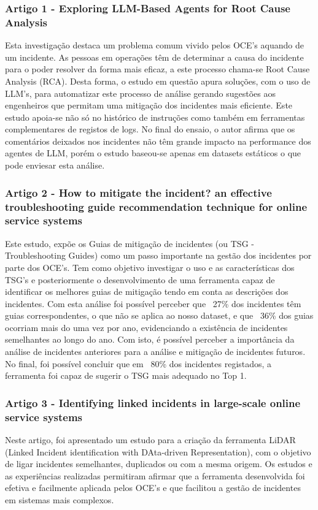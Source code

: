 		\subsubsection{Artigo 1 - Exploring LLM-Based Agents for Root Cause Analysis}
			Esta investigação destaca um problema comum vivido pelos OCE's aquando de um incidente. As pessoas em operações têm de determinar a causa do incidente para o poder resolver da forma mais eficaz, a este processo chama-se Root Cause Analysis (RCA). Desta forma, o estudo em questão apura soluções, com o uso de LLM's, para automatizar este processo de análise gerando sugestões aos engenheiros que permitam uma mitigação dos incidentes mais eficiente. Este estudo apoia-se não só no histórico de instruções como também em ferramentas complementares de registos de logs. No final do ensaio, o autor afirma que os comentários deixados nos incidentes não têm grande impacto na performance dos agentes de LLM, porém o estudo baseou-se apenas em datasets estáticos o que pode enviesar esta análise.
	
		\subsubsection{Artigo 2 - How to mitigate the incident? an effective troubleshooting guide recommendation technique for online service systems}
			Este estudo, expõe os Guias de mitigação de incidentes (ou TSG - Troubleshooting Guides) como um passo importante na gestão dos incidentes por parte dos OCE's. Tem como objetivo investigar o uso e as características dos TSG's e posteriormente o desenvolvimento de uma ferramenta capaz de identificar os melhores guias de mitigação tendo em conta as descrições dos incidentes. Com esta análise foi possível perceber que ~27\% dos incidentes têm guias correspondentes, o que não se aplica ao nosso dataset, e que ~36\% dos guias ocorriam mais do uma vez por ano, evidenciando a existência de incidentes semelhantes ao longo do ano. Com isto, é possível perceber a importância da análise de incidentes anteriores para a análise e mitigação de incidentes futuros. No final, foi possível concluir que em ~80\% dos incidentes registados, a ferramenta foi capaz de sugerir o TSG mais adequado no Top 1.
		
		\subsubsection{Artigo 3 - Identifying linked incidents in large-scale online service systems}
			Neste artigo, foi apresentado um estudo para a criação da ferramenta LiDAR (Linked Incident identification with DAta-driven Representation), com o objetivo de ligar incidentes semelhantes, duplicados ou com a mesma origem. Os estudos e as experiências realizadas permitiram afirmar que a ferramenta desenvolvida foi efetiva e facilmente aplicada pelos OCE's e que facilitou a gestão de incidentes em sistemas mais complexos.
		
